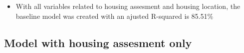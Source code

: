 \documentclass[]{article}
\newenvironment{Shaded}{\begin{snugshade}}{\end{snugshade}}
\newcommand{\DataTypeTok}[1]{\textcolor[rgb]{0.13,0.29,0.53}{#1}}
\newcommand{\DecValTok}[1]{\textcolor[rgb]{0.00,0.00,0.81}{#1}}
\newcommand{\KeywordTok}[1]{\textcolor[rgb]{0.13,0.29,0.53}{\textbf{#1}}}
\newcommand{\NormalTok}[1]{#1}
\newcommand{\OperatorTok}[1]{\textcolor[rgb]{0.81,0.36,0.00}{\textbf{#1}}}
\newcommand{\StringTok}[1]{\textcolor[rgb]{0.31,0.60,0.02}{#1}}
\providecommand{\tightlist}{%
  \setlength{\itemsep}{0pt}\setlength{\parskip}{0pt}}
\begin{document}
\begin{itemize}
\tightlist
\item
  With all variables related to housing assesment and housing location,
  the baseline model was created with an ajusted R-squared is 85.51\%
\end{itemize}

\hypertarget{model-with-housing-assesment-only}{%
\subsection{Model with housing assesment
only}\label{model-with-housing-assesment-only}}

\begin{Shaded}
\end{Shaded}
\end{document}
